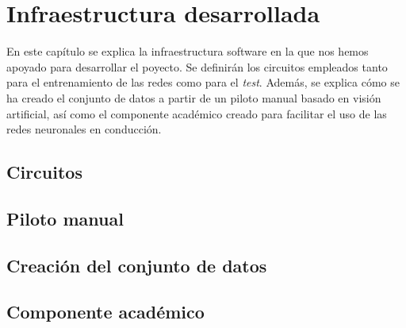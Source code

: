 \chapter{Infraestructura desarrollada}\label{cap.infraestructura}

En este capítulo se explica la infraestructura software en la que nos hemos apoyado  para desarrollar el poyecto. Se definirán los circuitos empleados tanto para el entrenamiento de las redes como para el \textit{test}. Además, se explica cómo se ha creado el conjunto de datos a partir de un piloto manual basado en visión artificial, así como el componente académico creado para facilitar el uso de las redes neuronales en conducción.


\section{Circuitos}

\section{Piloto manual}

\section{Creación del conjunto de datos}

\section{Componente académico}
